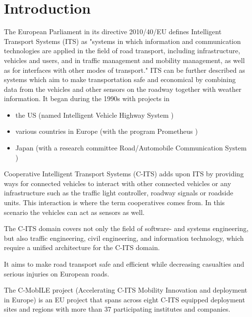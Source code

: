 \documentclass[conference]{IEEEtran}
\begin{document}
\section{Introduction}

The European Parliament in its directive 2010/40/EU \cite{ec} defines Intelligent Transport Systems (ITS) as "systems in which information and communication technologies are applied in the field of road transport, including infrastructure, vehicles and users, and in traffic management and mobility management, as well as for interfaces with other modes of transport."
ITS can be further described as systems which aim to make transportation safe and economical by combining data from the vehicles and other sensors on the roadway together with weather information. It began during the 1990s\cite{itsbegin} with projects in
\begin{itemize}
	\item the US (named Intelligent Vehicle Highway System \cite{ivhs})
	\item various countries in Europe (with the program Prometheus \cite{prometheus})
	\item Japan (with a research committee Road/Automobile Communication System \cite{racs})
\end{itemize}

Cooperative Intelligent Transport Systems (C-ITS) \cite{c-its} adds upon ITS by providing ways for connected vehicles to interact with other connected vehicles or any infrastructure such as the traffic light controller, roadway signals or roadside units. This interaction is where the term cooperatives comes from. In this scenario the vehicles can act as sensors as well.

The C-ITS domain covers not only the field of software- and systems engineering, but also traffic engineering, civil engineering, and information technology, which require a unified architecture for the C-ITS domain.

It aims to make road transport safe and efficient while decreasing casualties and serious injuries on European roads.

The C-MobILE project (Accelerating C-ITS Mobility Innovation and deployment in Europe) is an EU project that spans across eight C-ITS equipped deployment sites and regions with more than 37 participating institutes and companies.
\end{document}
